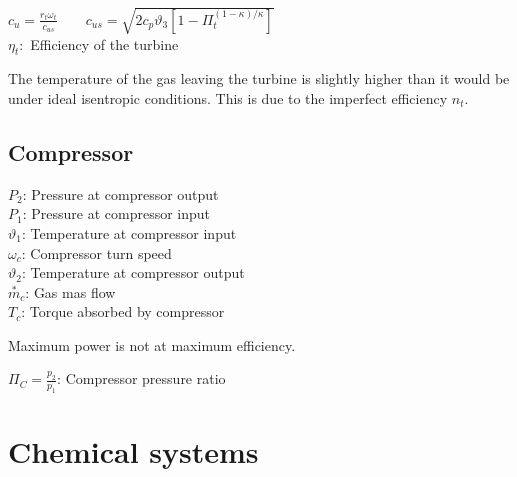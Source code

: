 \documentclass[10pt,a4paper]{scrartcl}
\begin{document}
\begin{multicols*}{3}

$c_u=\frac{r_t\omega_t}{c_{us}}\qquad c_{us}=\sqrt{2c_p\vartheta_3[1-\Pi_t^{(1-\kappa)/\kappa}]}$ \\
$\eta_t:$ Efficiency of the turbine


The temperature of the gas leaving the turbine is slightly higher than it would be under ideal isentropic conditions. This is due to the imperfect efficiency $n_t$.


\subsection{Compressor}\label{Compressor}


$P_2$: Pressure at compressor output \\
$P_1$: Pressure at compressor input \\
$\vartheta_1$: Temperature at compressor input \\
$\omega_c$: Compressor turn speed \\
$\vartheta_2$: Temperature at compressor output \\
$\overset{\ast}{m}_c$: Gas mas flow \\
$T_c$: Torque absorbed by compressor \\


Maximum power is not at maximum efficiency.



$\Pi_C=\frac{p_2}{p_1}$: Compressor pressure ratio

\columnbreak

\section{Chemical systems}



\end{multicols*}
\end{document}
